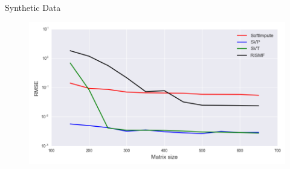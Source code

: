 \documentclass{beamer}
\begin{document}
\begin{frame}{Synthetic Data}
	\begin{figure}[h]
		\centering
		\includegraphics[width=1\linewidth]{./../results/synthetic/exper_3/synthetic_size_rmse.png}
		\label{heat_map}
	\end{figure}
\end{frame}
\end{document}
